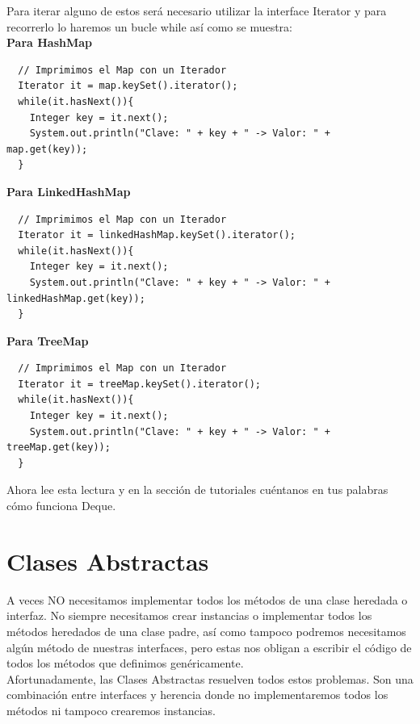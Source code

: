 \documentclass{article}
\begin{document}
Para iterar alguno de estos será necesario utilizar la interface Iterator y
para recorrerlo lo haremos un bucle while así como se muestra:\\

\textbf{Para HashMap}\\

\begin{verbatim}
  // Imprimimos el Map con un Iterador
  Iterator it = map.keySet().iterator();
  while(it.hasNext()){
    Integer key = it.next();
    System.out.println("Clave: " + key + " -> Valor: " + map.get(key));
  }
\end{verbatim}

\textbf{Para LinkedHashMap}\\

\begin{verbatim}
  // Imprimimos el Map con un Iterador
  Iterator it = linkedHashMap.keySet().iterator();
  while(it.hasNext()){
    Integer key = it.next();
    System.out.println("Clave: " + key + " -> Valor: " + linkedHashMap.get(key));
  }
\end{verbatim}

\textbf{Para TreeMap}

\begin{verbatim}
  // Imprimimos el Map con un Iterador
  Iterator it = treeMap.keySet().iterator();
  while(it.hasNext()){
    Integer key = it.next();
    System.out.println("Clave: " + key + " -> Valor: " + treeMap.get(key));
  }
\end{verbatim}

Ahora lee esta lectura y en la sección de tutoriales cuéntanos en tus palabras
cómo funciona Deque.


\section{Clases Abstractas}%
A veces NO necesitamos implementar todos los métodos de una clase heredada o
interfaz. No siempre necesitamos crear instancias o implementar todos los
métodos heredados de una clase padre, así como tampoco podremos necesitamos
algún método de nuestras interfaces, pero estas nos obligan a escribir el
código de todos los métodos que definimos genéricamente.\\

Afortunadamente, las Clases Abstractas resuelven todos estos problemas. Son una
combinación entre interfaces y herencia donde no implementaremos todos los
métodos ni tampoco crearemos instancias.\\
\end{document}
